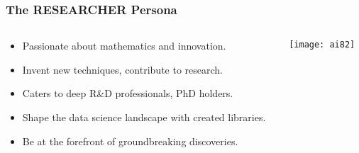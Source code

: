\begin{frame}[fragile]\frametitle{The RESEARCHER   Persona}

\begin{columns}
    \begin{column}[T]{0.6\linewidth}
        \begin{itemize}
            \item Passionate about mathematics and innovation.
            \item Invent new techniques, contribute to research.
            \item Caters to deep R\&D professionals, PhD holders.
            \item Shape the data science landscape with created libraries.
            \item Be at the forefront of groundbreaking discoveries.
        \end{itemize}

    \end{column}
    \begin{column}[T]{0.4\linewidth}


			\begin{center}
			\texttt{[image: ai82]}
			\end{center}
			
    \end{column}
  \end{columns}
  
  

\end{frame}


